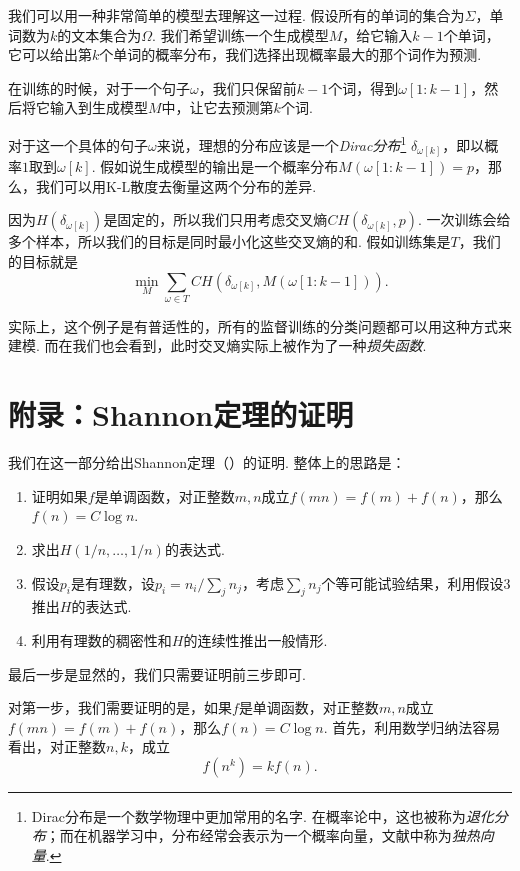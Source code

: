 我们可以用一种非常简单的模型去理解这一过程. 假设所有的单词的集合为$\Sigma$，单词数为$k$的文本集合为$\Omega$. 我们希望训练一个生成模型$M$，给它输入$k-1$个单词，它可以给出第$k$个单词的概率分布，我们选择出现概率最大的那个词作为预测. 

在训练的时候，对于一个句子$\omega$，我们只保留前$k-1$个词，得到$\omega[1:k-1]$，然后将它输入到生成模型$M$中，让它去预测第$k$个词. 

对于这一个具体的句子$\omega$来说，理想的分布应该是一个\textit{Dirac分布}\footnote{Dirac分布是一个数学物理中更加常用的名字. 在概率论中，这也被称为\textit{退化分布}；而在机器学习中，分布经常会表示为一个概率向量，文献中称为\textit{独热向量}. } $\delta_{\omega[k]}$，即以概率$1$取到$\omega[k]$. 假如说生成模型的输出是一个概率分布$M(\omega[1:k-1])=p$，那么，我们可以用K-L散度去衡量这两个分布的差异.

因为$H(\delta_{\omega[k]})$是固定的，所以我们只用考虑交叉熵$CH(\delta_{\omega[k]},p)$. 一次训练会给多个样本，所以我们的目标是同时最小化这些交叉熵的和. 假如训练集是$T$，我们的目标就是
\[
    \min_{M} \sum_{\omega\in T} CH(\delta_{\omega[k]},M(\omega[1:k-1])).
\]

实际上，这个例子是有普适性的，所有的监督训练的分类问题都可以用这种方式来建模. 而在我们也会看到，此时交叉熵实际上被作为了一种\textit{损失函数}.

\section{附录：Shannon定理的证明}\label{sec:Shannon-thm-proofs}
我们在这一部分给出Shannon定理（）的证明. 整体上的思路是：
\begin{enumerate}
    \item 证明如果$f$是单调函数，对正整数$m,n$成立$f(mn)=f(m)+f(n)$，那么$f(n)=C\log n$.
    \item 求出$H(1/n,\dots,1/n)$的表达式.
    \item 假设$p_i$是有理数，设$p_i=n_i/\sum_j n_j$，考虑$\sum_j n_j$个等可能试验结果，利用假设3推出$H$的表达式.
    \item 利用有理数的稠密性和$H$的连续性推出一般情形.
\end{enumerate}
最后一步是显然的，我们只需要证明前三步即可.

对第一步，我们需要证明的是，如果$f$是单调函数，对正整数$m,n$成立$f(mn)=f(m)+f(n)$，那么$f(n)=C\log n$. 首先，利用数学归纳法容易看出，对正整数$n,k$，成立
\begin{equation}
    f(n^k)=kf(n).\label{eq:Shannon-thm-proof-1}
\end{equation}

